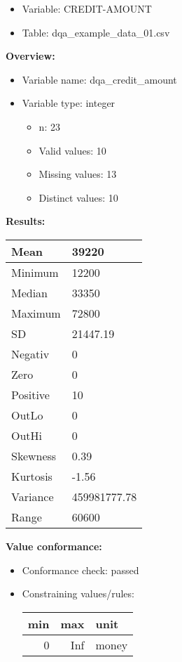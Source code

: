 \documentclass[
]{article}
\providecommand{\tightlist}{%
  \setlength{\itemsep}{0pt}\setlength{\parskip}{0pt}}
\begin{document}
\begin{itemize}
\tightlist
\item
  Variable: CREDIT-AMOUNT
\item
  Table: dqa\_example\_data\_01.csv
\end{itemize}

\textbf{Overview:}

\begin{itemize}
\tightlist
\item
  Variable name: dqa\_credit\_amount
\item
  Variable type: integer

  \begin{itemize}
  \tightlist
  \item
    n: 23
  \item
    Valid values: 10
  \item
    Missing values: 13
  \item
    Distinct values: 10
  \end{itemize}
\end{itemize}

\textbf{Results:}\\

\begin{table}[H]
\centering
\begin{tabular}{l|l}
\hline
Mean & 39220\\
\hline
Minimum & 12200\\
\hline
Median & 33350\\
\hline
Maximum & 72800\\
\hline
SD & 21447.19\\
\hline
Negativ & 0\\
\hline
Zero & 0\\
\hline
Positive & 10\\
\hline
OutLo & 0\\
\hline
OutHi & 0\\
\hline
Skewness & 0.39\\
\hline
Kurtosis & -1.56\\
\hline
Variance & 459981777.78\\
\hline
Range & 60600\\
\hline
\end{tabular}
\end{table}

\textbf{Value conformance:}

\begin{itemize}
\tightlist
\item
  Conformance check: passed
\item
  Constraining values/rules:

  \begin{table}[H]
  \centering
  \begin{tabular}{r|r|l}
  \hline
  \textbf{min} & \textbf{max} & \textbf{unit}\\
  \hline
  0 & Inf & money\\
  \hline
  \end{tabular}
  \end{table}
\end{itemize}
\end{document}
